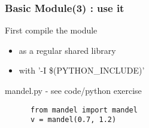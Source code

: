 \begin{frame}[fragile]
  \frametitle{Basic Module(3) : use it}
  \begin{block}{First compile the module}
    \begin{itemize}
    \item as a regular shared library
    \item with '-I \$(PYTHON\_INCLUDE)'
    \end{itemize}
  \end{block}
  \begin{block}{mandel.py - see code/python exercise}
    \begin{verbatim}
      from mandel import mandel
      v = mandel(0.7, 1.2)
    \end{verbatim}
  \end{block}
\end{frame}
